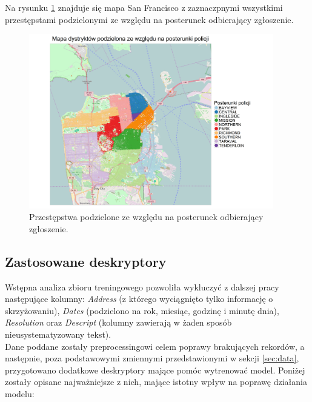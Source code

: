 \documentclass[11pt]{article} %
\begin{document}
Na rysunku \ref{fig:sf_districts} znajduje się mapa San Francisco z zaznaczpnymi wszystkimi przestępstami podzielonymi ze względu na posterunek odbierający zgłoszenie. \\

\begin{figure}[!h]
  \centering
    \includegraphics[width=0.95\textwidth]{images/sf_districts}
  \caption{Przestępstwa podzielone ze względu na posterunek odbierający zgłoszenie.} \label{fig:sf_districts}
\end{figure}


\subsection{Zastosowane deskryptory}

Wstępna analiza zbioru treningowego pozwoliła wykluczyć z dalszej pracy następujące kolumny: \textit{Address} (z którego wyciągnięto tylko informację o skrzyżowaniu), \textit{Dates} (podzielono na rok, miesiąc, godzinę i minutę dnia), \textit{Resolution} oraz \textit{Descript} (kolumny zawierają w żaden sposób nieusystematyzowany tekst). \\

Dane poddane zostały preprocessingowi celem poprawy brakujących rekordów, a następnie, poza podstawowymi zmiennymi przedstawionymi w sekcji \ref{sec:data}, przygotowano dodatkowe deskryptory mające pomóc wytrenować model. Poniżej zostały opisane najważniejsze z nich, mające istotny wpływ na poprawę działania modelu:
\end{document}
